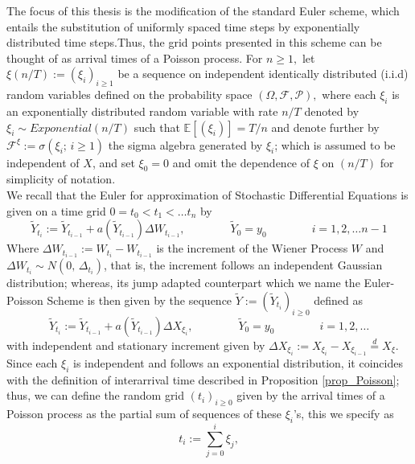 The focus of this thesis is the modification of the standard Euler scheme, which entails the substitution of uniformly spaced time steps by exponentially distributed time steps.Thus, the grid points presented in this scheme can be thought of as arrival times of a Poisson process. For $n \geq 1 ,$ let $ \xi (n/T) := (\xi_{i})_{i \geq 1}$  be a sequence on independent identically distributed (i.i.d) random variables defined on the probability space  $(\Omega, \mathcal{F}, \mathcal{P}),$ where each $\xi_i$ is an exponentially distributed random variable with rate $n/T$ denoted by  $\xi_{i} \sim Exponential(n/T)$ such that $\mathbb{E}[ (\xi_{i})]= T/n $ and denote further by $\mathcal{F}^{\xi} := \sigma( \xi_{i} ; \,  i \geq 1)$ the sigma algebra generated by $ \xi_i $; which is assumed to be independent of $X$, and set  $\xi_{0} = 0$ and omit the dependence of $\xi $ on $(n/T)$ for simplicity of notation. \\
We recall that the Euler for approximation of Stochastic Differential Equations is given on a time grid $0 = t_0 < t_1 < \ldots t_n$ by
\begin{equation*}
\tilde{Y}_{t_{i}} := \tilde{Y}_{t_{i-1}} + a(\tilde{Y}_{t_{i-1}})\Delta W_{t_{i-1}},  \qquad \qquad
  \tilde{Y}_0 = y_0 \qquad \qquad  i = 1, 2, \ldots n-1 
\end{equation*}
Where $\Delta W_{t_{i-1}} := W_{t_{i}}-W_{t_{i-1}}$ is the increment of the Wiener Process $W$ and $\Delta W_{t_{i}} \sim N (0, \, \Delta_{t_{i}})$, that is, the increment follows an independent Gaussian distribution; whereas, its jump adapted counterpart which we name the Euler-Poisson Scheme is then given by the sequence $\tilde{Y} := (\tilde{Y}_{t_i})_{i\geq 0}$ defined as 
\begin{equation}\label{eq5}
\tilde{Y}_{t_{i}} := \tilde{Y}_{t_{i-1}} + a(\tilde{Y}_{t_{i-1}})\Delta X_{\xi_{i}},  \qquad \qquad
  \tilde{Y}_0 = y_0 \qquad \qquad  i = 1, 2, \ldots 
\end{equation}
with independent and stationary increment given by $\Delta X_{\xi_{i}} :=  X_{\xi_{i}} - X_{\xi_{i-1}} \overset{d}{=}  X_{\xi}$. Since each $\xi_{i}$ is independent and follows an exponential distribution, it coincides with the definition of interarrival time described in Proposition \ref{prop_Poisson}; thus, we can define the random grid $(t_{i})_{i \geq 0}$ given by the arrival times of a Poisson process as the partial sum of sequences of these $\xi_{i}$'s, this we specify as 
\begin{equation*}
 t_{i} := \sum_{j=0}^{i}  \xi_{j},
\end{equation*}
